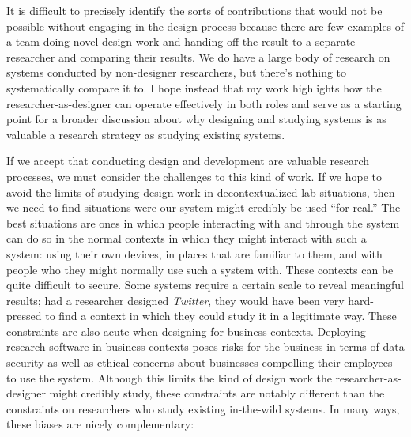 It is difficult to precisely identify the sorts of contributions that would not be possible without engaging in the design process because there are few examples of a team doing novel design work and handing off the result to a separate researcher and comparing their results. We do have a large body of research on systems conducted by non-designer researchers, but there's nothing to systematically compare it to. I hope instead that my work highlights how the researcher-as-designer can operate effectively in both roles and serve as a starting point for a broader discussion about why designing and studying systems is as valuable a research strategy as studying existing systems. 

If we accept that conducting design and development are valuable research processes, we must consider the challenges to this kind of work. If we hope to avoid the limits of studying design work in decontextualized lab situations, then we need to find situations were our system might credibly be used ``for real.'' The best situations are ones in which people interacting with and through the system can do so in the normal contexts in which they might interact with such a system: using their own devices, in places that are familiar to them, and with people who they might normally use such a system with. These contexts can be quite difficult to secure. Some systems require a certain scale to reveal meaningful results; had a researcher designed \emph{Twitter}, they would have been very hard-pressed to find a context in which they could study it in a legitimate way. These constraints are also acute when designing for business contexts. Deploying research software in business contexts poses risks for the business in terms of data security as well as ethical concerns about businesses compelling their employees to use the system. Although this limits the kind of design work the researcher-as-designer might credibly study, these constraints are notably different than the constraints on researchers who study existing in-the-wild systems. In many ways, these biases are nicely complementary:

